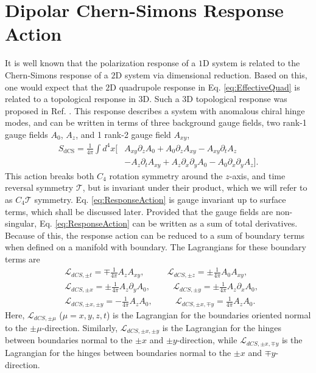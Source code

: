 \documentclass[prb,aps,twocolumn,groupaddress,floatfix]{revtex4-1}
\begin{document}
\section{Dipolar Chern-Simons Response Action}\label{sec:ResponseAction}
It is well known that the polarization response of a $1$D system is related to the Chern-Simons response of a $2$D system via dimensional reduction\cite{qi2008}.  Based on this, one would expect that the $2$D quadrupole response in Eq. \ref{eq:EffectiveQuad} is related to a topological response in $3$D. Such a $3$D topological response was proposed in Ref. . This response describes a system with anomalous chiral hinge modes, and can be written in terms of three background gauge fields, two rank-1 gauge fields $A_0$, $A_z$, and 1 rank-2 gauge field $A_{xy}$,
\begin{equation}
\begin{split}
S_{\text{dCS}} = \frac{1}{4\pi} \int d^4x[&A_{xy}\partial_z A_0 +A_{0}\partial_z A_{xy} -  A_{xy}\partial_t A_z \\ &-   A_{z}\partial_t A_{xy} + A_z \partial_x \partial_y A_0 - A_0 \partial_x \partial_y A_z ].
\end{split}
\label{eq:ResponseAction}\end{equation}
This action breaks both $C_4$ rotation symmetry around the $z$-axis, and time reversal symmetry $\mathcal{T}$, but is invariant under their product, which we will refer to as $C_4\mathcal{T}$ symmetry. Eq. \ref{eq:ResponseAction} is gauge invariant up to surface terms, which shall be discussed later. Provided that the gauge fields are non-singular, Eq. \ref{eq:ResponseAction} can be written as a sum of total derivatives. Because of this, the response action can be reduced to a sum of boundary terms when defined on a manifold with boundary. The Lagrangians for these boundary terms are
\begin{equation}
\begin{split}
&\mathcal{L}_{dCS,\pm t}= \mp\frac{1}{4\pi} A_z A_{xy}, \phantom{==}\mathcal{L}_{dCS,\pm z}= \pm\frac{1}{4\pi} A_0 A_{xy},\\
&\mathcal{L}_{dCS,\pm x}= \pm\frac{1}{4\pi} A_z \partial_y A_0,\phantom{==} \mathcal{L}_{dCS,\pm y}= \pm\frac{1}{4\pi} A_z \partial_x A_0,\\
&\mathcal{L}_{dCS,\pm x,\pm y} = -\frac{1}{4\pi} A_z A_0,\phantom{==}\mathcal{L}_{dCS,\pm x,\mp y} = \frac{1}{4\pi} A_z A_0.
\end{split}
\label{eq:BoundResponseAction}\end{equation}
Here, $\mathcal{L}_{dCS,\pm\mu}$ ($\mu = x,y,z,t$) is the Lagrangian for the boundaries oriented normal to the $\pm\mu$-direction. Similarly, $\mathcal{L}_{dCS,\pm x,\pm y} $ is the Lagrangian for the hinges between boundaries normal to the $\pm x$ and $\pm y$-direction, while $\mathcal{L}_{dCS,\pm x,\mp y} $ is the Lagrangian for the hinges between boundaries normal to the $\pm x$ and $\mp y$-direction. 
\end{document}
